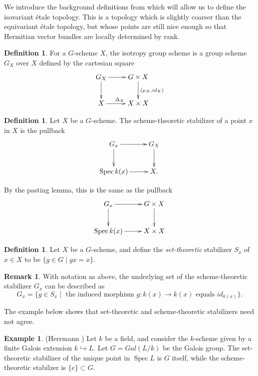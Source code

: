 \documentclass[edeposit,fullpage]{uiucthesis2009}
\DeclareMathOperator{\Spec}{Spec}
\theoremstyle{plain}
\numberwithin{lemma}{section}
\theoremstyle{definition}
\newtheorem{example}[lemma]{Example}
\newtheorem{definition}[lemma]{Definition}
\newtheorem{remark}[lemma]{Remark}
\begin{document}
We introduce the background definitions from \cite{GrpSchHell} which
will allow us to define the isovariant \'etale topology. This is a topology
which is slightly coarser than the equivariant \'etale topology,
but whose points are still nice enough so that Hermitian vector
bundles are locally determined by rank. 

\begin{definition}
For a $G$-scheme $X$, the isotropy group scheme is a group scheme
$G_X$ over $X$ defined by the cartesian square
\[
\xymatrix{G_X \ar[r] \ar[d] & G \times X \ar[d]^{(\mu_X,id_X)} \\ X
  \ar[r]^{\Delta_X} & X \times X}
\]
\end{definition}

\begin{definition}
Let $X$ be a $G$-scheme. The scheme-theoretic stabilizer of a point
$x$ in $X$ is the pullback
\[
\xymatrix{G_x \ar[r] \ar[d] & G_X \ar[d]\\ \Spec k(x) \ar[r] & X.}
\]

By the pasting lemma, this is the same as the pullback
\[
\xymatrix{G_x \ar[r] \ar[d] & G \times X \ar[d]\\ \Spec k(x) \ar[r] &
  X \times X}
\]
\end{definition}

\begin{definition}
Let $X$ be a $G$-scheme, and define the \emph{set-theoretic}
stabilizer $S_x$ of $x \in X$ to be $\{g \in G
\mid gx = x\}$. 
\end{definition}

\begin{remark}
With notation as above, the underlying set of the scheme-theoretic
stabilizer $G_x$ can be described as
\[
G_x = \{g \in S_x \mid \text{ the induced morphism $g : k(x)
  \rightarrow k(x)$ equals } id_{k(x)}\}.
\]
\end{remark}



The example below shows that set-theoretic and scheme-theoretic
stabilizers need not agree.

\begin{example} (Herrmann \cite{GrpSchHerr})
Let $k$ be a field, and consider the $k$-scheme given by a finite
Galois extension $k \hookrightarrow L$. Let $G = Gal(L/k)$ be the
Galois group. The set-theoretic stabilizer of the unique point in
$\Spec L$ is $G$ itself, while the scheme-theoretic stabilzer is
$\{e\} \subset G$. 
\end{example}
\end{document}
